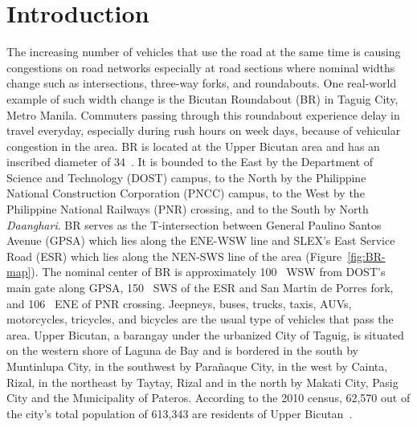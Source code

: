 \documentclass[preprint]{./acm_proc_article-sp}
\begin{document}
\section{Introduction}
The increasing number of vehicles that use the road at the same time is causing congestions on road networks  especially at road sections where nominal widths change such as intersections, three-way forks, and roundabouts. One real-world example of such width change is the Bicutan Roundabout (BR) in Taguig City, Metro Manila. Commuters passing through this roundabout experience delay in travel everyday, especially during rush hours on week days, because of vehicular congestion in the area. BR is located at the Upper Bicutan area and has an inscribed diameter of 34~. It is bounded to the East by the Department of Science and Technology (DOST) campus, to the North by the Philippine National Construction Corporation (PNCC) campus, to the West by the Philippine National Railways (PNR) crossing, and to the South by North {\em Daanghari}. BR serves as the T-intersection between General Paulino Santos Avenue (GPSA) which lies along the ENE-WSW line and SLEX's East Service Road (ESR) which lies along the NEN-SWS line of the area (Figure~\ref{fig:BR-map}). The nominal center of BR is approximately 100~ WSW from DOST's main gate along GPSA, 150~ SWS of the ESR and San Martin de Porres fork, and 106~ ENE of PNR crossing. Jeepneys, buses, trucks, taxis, AUVs, motorcycles, tricycles, and bicycles are the usual type of vehicles that pass the area. Upper Bicutan, a barangay under the urbanized City of Taguig, is situated on the western shore of Laguna de Bay and is bordered in the south by Muntinlupa City, in the southwest by Para\~naque City, in the west by Cainta, Rizal, in the northeast by Taytay, Rizal and in the north by Makati City, Pasig City and the Municipality of Pateros. According to the 2010 census, 62,570 out of the city's total population of 613,343 are residents of Upper Bicutan~\citep{taguig-web}.

\begin{figure*}[bt]
\centering{}
\caption{The area map of Upper Bicutan, Taguig City showing the relative location of BR~\citep{googlemap13}.}\label{fig:BR-map}
\end{figure*}
\end{document}
